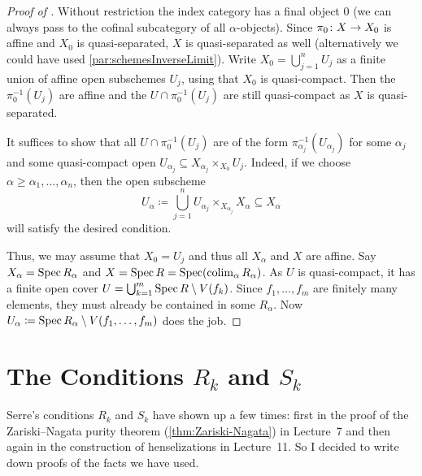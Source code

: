 \begin{proof}[Proof of ]
	Without restriction the index category has a final object $0$ (we can always pass to the cofinal subcategory of all $\alpha$-objects). Since $\pi_0\colon X\morphism X_0$ is affine and $X_0$ is quasi-separated, $X$ is quasi-separated as well (alternatively we could have used \cref{par:schemesInverseLimit}). Write $X_0=\bigcup_{j=1}^nU_j$ as a finite union of affine open subschemes $U_j$, using that $X_0$ is quasi-compact. Then the $\pi_0^{-1}(U_j)$ are affine and the $U\cap \pi_0^{-1}(U_j)$ are still quasi-compact as $X$ is quasi-separated.
	
	It suffices to show that all $U\cap \pi_0^{-1}(U_j)$ are of the form $\pi_{\alpha_j}^{-1}(U_{\alpha_j})$ for some $\alpha_j$ and some quasi-compact open $U_{\alpha_j}\subseteq X_{\alpha_j}\times_{X_0}U_j$. Indeed, if we choose $\alpha\geq \alpha_1,\dotsc,\alpha_n$, then the open subscheme
	\begin{equation*}
		U_\alpha\coloneqq \bigcup_{j=1}^nU_{\alpha_j}\times_{X_{\alpha_j}}X_\alpha\subseteq X_\alpha
	\end{equation*}
	will satisfy the desired condition.
	
	Thus, we may assume that $X_0=U_j$ and thus all $X_\alpha$ and $X$ are affine. Say $X_\alpha=\operatorname{Spec} R_\alpha$ and $X=\operatorname{Spec} R=\operatorname{Spec}(\operatorname*{colim}_\alpha R_\alpha)$. As $U$ is quasi-compact, it has a finite open cover $U=\bigcup_{k=1}^m\operatorname{Spec} R\setminus V(f_k)$. Since $f_1,\dotsc,f_m$ are finitely many elements, they must already be contained in some $R_\alpha$. Now $U_\alpha\coloneqq \operatorname{Spec} R_\alpha\setminus V(f_1,\dotsc,f_m)$ does the job.
\end{proof}
\section{The Conditions \texorpdfstring{$R_k$}{Rk} and \texorpdfstring{$S_k$}{Sk}}
Serre's conditions $R_k$ and $S_k$ have shown up a few times: first in the proof of the Zariski--Nagata purity theorem (\cref{thm:Zariski-Nagata}) in Lecture~7 and then again in the construction of henselizations in Lecture~11. So I decided to write down proofs of the facts we have used.

